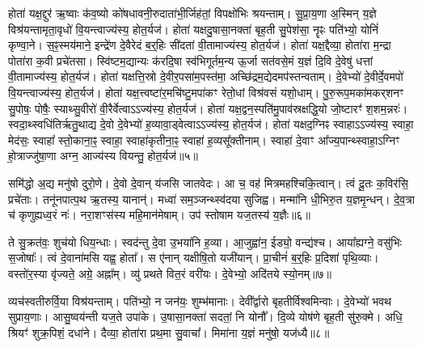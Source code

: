 होता॑ यक्ष॒द्दुर॑ ऋ॒ष्वाः क॑व॒ष्यो को॑षधावनी॒रुदाता॑भी॒र्जिह॑तां॒ विपक्षो॑भिः श्रयन्ताम्।
सु॒प्रा॒य॒णा अ॒स्मिन् य॒ज्ञे विश्र॑यन्तामृता॒वृधो॑ वि॒यन्त्वाज्य॑स्य॒ होत॒र्यज॑।
होता॑ यक्षदु॒षासा॒नक्ता॑ बृह॒ती सु॒पेश॑सा॒ नॄꣴः पति॑भ्यो॒ योनिं॑ कृण्वा॒ने।
स॒ꣴ॒स्मय॑माने॒ इन्द्रे॑ण दे॒वैरेदं ब॒र्॒हिः सी॑दतां वी॒तामाज्य॑स्य॒ होत॒र्यज॑।
होता॑ यक्ष॒द्दैव्या॒ होता॑रा म॒न्द्रा पोता॑रा क॒वी प्रचे॑तसा।
स्वि॑ष्टम॒द्यान्यः क॑रदि॒षा स्व॑भिगूर्तम॒न्य ऊ॒र्जा सत॑वसे॒मं य॒ज्ञं दि॒वि दे॒वेषु॑ धत्तां वी॒तामाज्य॑स्य॒ होत॒र्यज॑।
होता॑ यक्षत्ति॒स्रो दे॒वीर॒पसा॑म॒पस्त॑मा॒ अच्छि॑द्रम॒द्येदमप॑स्तन्वताम्।
दे॒वेभ्यो॑ दे॒वीर्दे॒वमपो॑ वि॒यन्त्वाज्य॑स्य॒ होत॒र्यज॑।
होता॑ यक्ष॒त्त्वष्टा॑र॒मचि॑ष्टु॒मपा॑कꣳ रेतो॒धां विश्र॑वसं यशो॒धाम्।
पु॒रु॒रूप॒मका॑मकर्‌\mbox{}शनꣳ सु॒पोषः॒ पोषैः॒ स्याथ्सु॒वीरो॑ वी॒रैर्वेत्वा\-ऽ\-ऽ\-ज्य॑स्य॒ होत॒र्यज॑।
होता॑ यक्ष॒द्वन॒स्पति॑मु॒पाव॑स्रक्षद्धि॒यो जो॒ष्टारꣳ॑ श॒शम॒न्नरः॑।
स्वदा॒थ्स्वधि॑तिर्\mbox{}ऋतु॒थाद्य दे॒वो दे॒वेभ्यो॑ ह॒व्यावा॒ड्वेत्वा\-ऽ\-ऽ\-ज्य॑स्य॒ होत॒र्यज॑।
होता॑ यक्षद॒ग्निꣴ स्वाहा\-ऽऽज्य॑स्य॒ स्वाहा॒ मेद॑सः॒ स्वाहा᳚ स्तो॒काना॒ꣴ॒ स्वाहा॒ स्वाहा॑कृतीना॒ꣴ॒ स्वाहा॑ ह॒व्यसू᳚क्तीनाम्।
स्वाहा॑ दे॒वाꣳ आ᳚ज्य॒पान्थ्स्वाहा॒\-ऽग्निꣳ हो॒त्राज्जु॑षा॒णा अग्न॒ आज्य॑स्य वियन्तु॒ होत॒र्यज॑॥५॥\ip{}

समि॑द्धो अ॒द्य मनु॑षो दुरो॒णे।
दे॒वो दे॒वान् य॑जसि जातवेदः।
आ च॒ वह॑ मित्रमहश्चिकि॒त्वान्।
त्वं दू॒तः क॒विर॑सि॒ प्रचे॑ताः।
तनू॑नपात्प॒थ ऋ॒तस्य॒ यानान्॑।
मध्वा॑ सम॒ञ्जन्थ्स्व॑दया सुजिह्व।
मन्मा॑नि धी॒भिरु॒त य॒ज्ञमृ॒न्धन्।
दे॒व॒त्रा च॑ कृणुह्यध्व॒रं नः॑।
नरा॒शꣳस॑स्य महि॒मान॑मेषाम्।
उप॑ स्तोषाम यज॒तस्य॑ य॒ज्ञैः॥६॥\ip

ते सु॒क्रत॑वः॒ शुच॑यो धिय॒न्धाः।
स्वद॑न्तु दे॒वा उ॒भया॑नि ह॒व्या।
आ॒जुह्वा॑न॒ ईड्यो॒ वन्द्य॑श्च।
आया᳚ह्यग्ने॒ वसु॑भिः स॒जोषाः᳚।
त्वं दे॒वाना॑मसि यह्व॒ होता᳚।
स ए॑नान् यक्षीषि॒तो यजी॑यान्।
प्रा॒चीनं॑ ब॒र्‌॒\mbox{}हिः प्र॒दिशा॑ पृथि॒व्याः।
वस्तो॑र॒स्या वृ॑ज्यते॒ अग्रे॒ अह्ना᳚म्।
व्यु॑ प्रथते वित॒रं वरी॑यः।
दे॒वेभ्यो॒ अदि॑तये स्यो॒नम्॥७॥\ip

व्यच॑स्वतीरुर्वि॒या विश्र॑यन्ताम्।
पति॑भ्यो॒ न जन॑यः॒ शुम्भ॑\-मानाः।
देवी᳚र्द्वारो बृहतीर्विश्वमिन्वाः।
दे॒वेभ्यो॑ भवथ सुप्राय॒णाः।
आसु॒ष्वय॑न्ती यज॒ते उपा॑के।
उ॒षासा॒नक्ता॑ सदतां॒ नि योनौ᳚।
दि॒व्ये योष॑णे बृह॒ती सु॑रु॒क्मे।
अधि॒ श्रियꣳ॑ शुक्र॒पिशं॒ दधा॑ने।
दैव्या॒ होता॑रा प्रथ॒मा सु॒वाचा᳚।
मिमा॑ना य॒ज्ञं मनु॑षो॒ यज॑ध्यै॥८॥\ip

